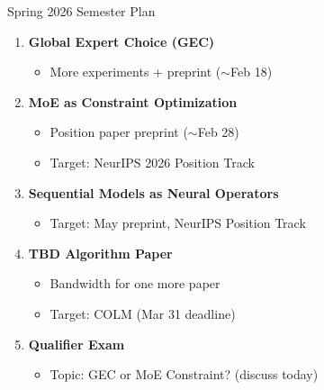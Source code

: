 \documentclass{beamer}
\begin{document}
\begin{frame}{Spring 2026 Semester Plan}
\begin{enumerate}
    \item \textbf{Global Expert Choice (GEC)}
    \begin{itemize}
        \item More experiments + preprint ($\sim$Feb 18)
    \end{itemize}
    
    \item \textbf{MoE as Constraint Optimization}
    \begin{itemize}
        \item Position paper preprint ($\sim$Feb 28)
        \item Target: NeurIPS 2026 Position Track
    \end{itemize}
    
    \item \textbf{Sequential Models as Neural Operators}
    \begin{itemize}
        \item Target: May preprint, NeurIPS Position Track
    \end{itemize}
    
    \item \textbf{TBD Algorithm Paper}
    \begin{itemize}
        \item Bandwidth for one more paper
        \item Target: COLM (Mar 31 deadline)
    \end{itemize}
    
    \item \textbf{Qualifier Exam}
    \begin{itemize}
        \item Topic: GEC or MoE Constraint? (discuss today)
    \end{itemize}
\end{enumerate}
\end{frame}
\end{document}
